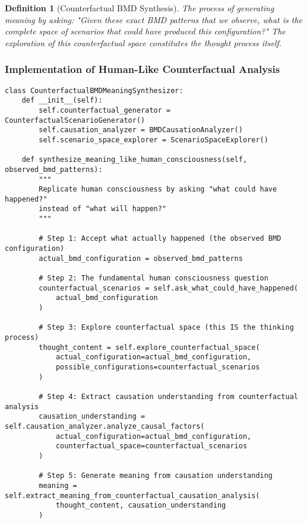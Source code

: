 \documentclass[12pt,a4paper]{article}
\newtheorem{definition}[theorem]{Definition}
\begin{document}
\begin{definition}[Counterfactual BMD Synthesis]
The process of generating meaning by asking: "Given these exact BMD patterns that we observe, what is the complete space of scenarios that could have produced this configuration?" The exploration of this counterfactual space constitutes the thought process itself.
\end{definition}

\subsubsection{Implementation of Human-Like Counterfactual Analysis}

\begin{lstlisting}[style=pythonstyle, caption=Counterfactual BMD Meaning Synthesis Engine]
class CounterfactualBMDMeaningSynthesizer:
    def __init__(self):
        self.counterfactual_generator = CounterfactualScenarioGenerator()
        self.causation_analyzer = BMDCausationAnalyzer()
        self.scenario_space_explorer = ScenarioSpaceExplorer()
        
    def synthesize_meaning_like_human_consciousness(self, observed_bmd_patterns):
        """
        Replicate human consciousness by asking "what could have happened?"
        instead of "what will happen?"
        """
        
        # Step 1: Accept what actually happened (the observed BMD configuration)
        actual_bmd_configuration = observed_bmd_patterns
        
        # Step 2: The fundamental human consciousness question
        counterfactual_scenarios = self.ask_what_could_have_happened(
            actual_bmd_configuration
        )
        
        # Step 3: Explore counterfactual space (this IS the thinking process)
        thought_content = self.explore_counterfactual_space(
            actual_configuration=actual_bmd_configuration,
            possible_configurations=counterfactual_scenarios
        )
        
        # Step 4: Extract causation understanding from counterfactual analysis
        causation_understanding = self.causation_analyzer.analyze_causal_factors(
            actual_configuration=actual_bmd_configuration,
            counterfactual_space=counterfactual_scenarios
        )
        
        # Step 5: Generate meaning from causation understanding
        meaning = self.extract_meaning_from_counterfactual_causation_analysis(
            thought_content, causation_understanding
        )
        

\end{lstlisting}
\end{document}
